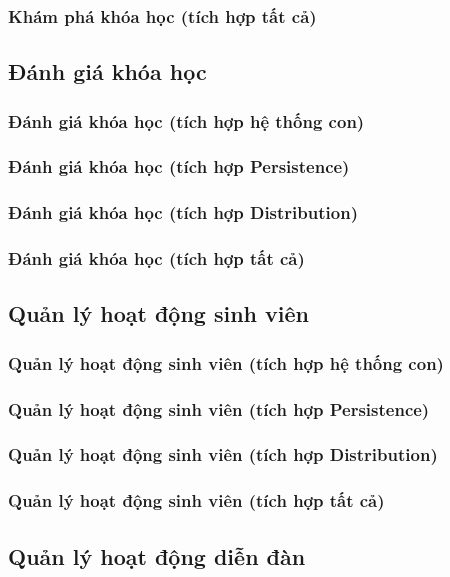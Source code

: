 \documentclass[./../main.tex]{subfiles}
\begin{document}
\subsubsection{Khám phá khóa học (tích hợp tất cả)}

\subsection{Đánh giá khóa học}
\subsubsection{Đánh giá khóa học (tích hợp hệ thống con)}
\subsubsection{Đánh giá khóa học (tích hợp Persistence)}
\subsubsection{Đánh giá khóa học (tích hợp Distribution)}
\subsubsection{Đánh giá khóa học (tích hợp tất cả)}

\subsection{Quản lý hoạt động sinh viên}
\subsubsection{Quản lý hoạt động sinh viên (tích hợp hệ thống con)}
\subsubsection{Quản lý hoạt động sinh viên (tích hợp Persistence)}
\subsubsection{Quản lý hoạt động sinh viên (tích hợp Distribution)}
\subsubsection{Quản lý hoạt động sinh viên (tích hợp tất cả)}

\subsection{Quản lý hoạt động diễn đàn}
\end{document}
